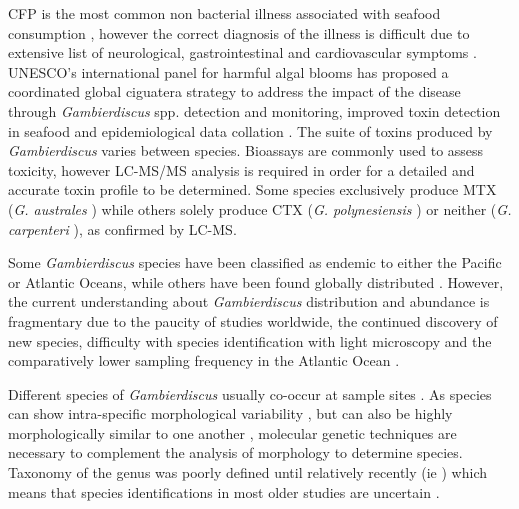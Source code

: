 \documentclass[12pt]{article}
\begin{document}
CFP is the most common non bacterial illness associated with seafood consumption \citep{friedman2008ciguatera}, however the correct diagnosis of the illness is difficult due to extensive list of neurological, gastrointestinal and cardiovascular symptoms \citep{sims1987theoretical}. UNESCO's international panel for harmful algal blooms has proposed a coordinated global ciguatera strategy to address the impact of the disease through \emph{Gambierdiscus} spp. detection and monitoring, improved toxin detection in seafood and epidemiological data collation \citep{globalcig}.
The suite of toxins produced by \emph{Gambierdiscus} varies between species. Bioassays are commonly used to assess toxicity, however LC-MS/MS analysis is required in order for a detailed and accurate toxin profile to be determined\citep{diogened2014chemistry}. Some species exclusively produce MTX (\emph{G. australes} \citep{rhodes2014production}) while others solely produce CTX (\emph{G. polynesiensis} \citep{rhodes2014production}) or neither (\emph{G. carpenteri} \citep{kohli2014high}), as confirmed by LC-MS. 

Some \emph{Gambierdiscus} species have been classified as endemic to either the Pacific or Atlantic Oceans, while others have been found globally distributed \citep{berdalet2012global,litaker2010global}. %
However, the current understanding about \emph{Gambierdiscus} distribution and abundance is fragmentary due to the paucity of studies worldwide, the continued discovery of new species, difficulty with species identification with light microscopy and the comparatively lower sampling frequency in the Atlantic Ocean \citep{berdalet2012global,nishimura2014morphology}. 

Different species of \emph{Gambierdiscus} usually co-occur at sample sites \citep{litaker2010global}. As species can show intra-specific morphological variability \citep{bravo2014cellular}, but can also be highly morphologically similar to one another \citep{kohli2014high}, molecular genetic techniques are necessary to complement the analysis of morphology to determine species. Taxonomy of the genus was poorly defined until relatively recently (ie \citep{litaker2009taxonomy,richlen2008phylogeography}) which means that species identifications in most older studies are uncertain \citep{berdalet2012global}. %
\end{document}
